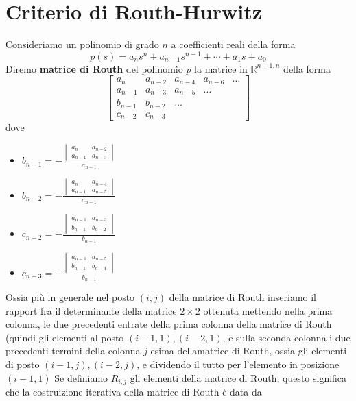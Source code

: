 \documentclass[12pt,a4paper]{article}
\numberwithin{theorem}{section}
\numberwithin{definition}{section}
\numberwithin{example}{section}
\newcounter{lem}[section]\setcounter{lem}{0}
\newcounter{defi}[section]\setcounter{defi}{0}
\begin{document}
\section{Criterio di Routh-Hurwitz}
Consideriamo un polinomio di grado $n$ a coefficienti reali della forma
 \begin{equation*}
     p(s)=a_n s^n + a_{n-1} s^{n-1} + \cdots + a_1 s + a_0
 \end{equation*}
Diremo \textbf{matrice di Routh} del polinomio $p$ la matrice in $\mathbb{R}^{n+1,n}$ della forma
 \begin{equation*}
    \begin{bmatrix} 
        a_n & a_{n-2} & a_{n-4} & a_{n-6}  & \ldots   \\
        a_{n-1} & a_{n-3} & a_{n-5} & \ldots  \\
        b_{n-1} & b_{n-2} & \ldots & \\
        c_{n-2} & c_{n-3} & &
    \end{bmatrix}
 \end{equation*}
dove 
\begin{itemize}
    \item  $b_{n-1} = -\frac{
\begin{vmatrix}
a_n & a_{n-2} \\
a_{n-1} & a_{n-3}
\end{vmatrix}
}{a_{n-1}}$ \\
\item $b_{n-2} = -\frac{\begin{vmatrix}
a_n & a_{n-4} \\
a_{n-1} & a_{n-5}
\end{vmatrix}}{a_{n-1}}$ \\
\item $c_{n-2} = -\frac{\begin{vmatrix}
a_{n-1} & a_{n-3} \\
b_{n-1} & b_{n-2}
\end{vmatrix}}{b_{n-1}}$ 
\item  $c_{n-3} = -\frac{\begin{vmatrix}
a_{n-1} & a_{n-5} \\
b_{n-1} & b_{n-3}
\end{vmatrix}}{b_{n-1}}$ \\
\end{itemize}
 Ossia più in generale nel posto $(i,j)$ della matrice di Routh inseriamo il rapport fra il determinante della matrice $2\times 2$ ottenuta mettendo nella prima colonna, le due precedenti entrate della prima colonna della matrice di Routh (quindi gli elementi al posto $(i-1,1),(i-2,1)$, e sulla seconda colonna i due precedenti termini della colonna $j$-esima dellamatrice di Routh, ossia gli elementi di posto $(i-1,j),(i-2,j)$, e dividendo il tutto per l'elemento in posizione $(i-1,1)$ Se definiamo $R_{i,j}$ gli elementi della matrice di Routh, questo significa che la costruizione iterativa della matrice di Routh è data da
\end{document}
